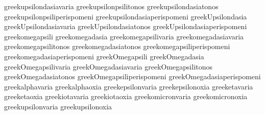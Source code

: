  greekupsilondasiavaria              {}
 greekupsilonpsilitonos              {}
 greekupsilondasiatonos              {}
 greekupsilonpsiliperispomeni        {}
 greekupsilondasiaperispomeni        {}
 greekUpsilondasia                   {}
 greekUpsilondasiavaria              {}
 greekUpsilondasiatonos              {}
 greekUpsilondasiaperispomeni        {}
 greekomegapsili                     {} %
 greekomegadasia                     {}
 greekomegapsilivaria                {}
 greekomegadasiavaria                {}
 greekomegapsilitonos                {}
 greekomegadasiatonos                {}
 greekomegapsiliperispomeni          {}
 greekomegadasiaperispomeni          {}
 greekOmegapsili                     {}
 greekOmegadasia                     {}
 greekOmegapsilivaria                {}
 greekOmegadasiavaria                {}
 greekOmegapsilitonos                {}
 greekOmegadasiatonos                {}
 greekOmegapsiliperispomeni          {}
 greekOmegadasiaperispomeni          {}
 greekalphavaria                     {} %
 greekalphaoxia                      {}
 greekepsilonvaria                   {}
 greekepsilonoxia                    {}
 greeketavaria                       {}
 greeketaoxia                        {}
 greekiotavaria                      {}
 greekiotaoxia                       {}
 greekomicronvaria                   {}
 greekomicronoxia                    {}
 greekupsilonvaria                   {}
 greekupsilonoxia                    {}
